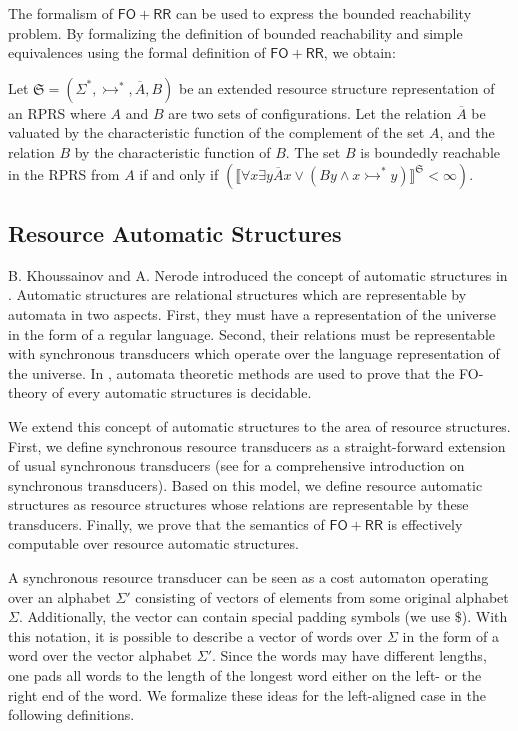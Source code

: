\documentclass{LMCS}
\newcommand{\semantics}[1]{\llbracket#1\rrbracket}
\newcommand{\structureS}{\mathfrak S}
\newcommand{\FORR}{\ensuremath{\mathsf{FO\!\!+\!\!RR}}}
\newcommand{\tspathTo}{\rightarrowtail^*}
\newcommand{\RPRS}{\textsf{RPRS}}
\begin{document}
The formalism of \FORR{} can be used to express the bounded reachability
problem. By formalizing the definition of bounded reachability and 
simple equivalences using the formal definition of \FORR{}, we obtain:

\begin{prop}\label{prop:BoundedReachabilityIsFORRExpressible}
  Let $\structureS = (\Sigma^*,\tspathTo,\overline{A},B)$ be an extended
resource structure representation of an \RPRS{} where $A$ and $B$ are two 
sets of configurations. Let the relation $\overline{A}$ be valuated by the 
characteristic function of the complement of the set $A$, and the relation $B$ by the 
characteristic function of $B$.
The set $B$ is boundedly reachable in the \RPRS{} from $A$ if and only if
  $(\semantics{\forall x \exists y \overline{A}x \vee (By \wedge x \tspathTo
y)}^\structureS < \infty)$.
\end{prop}


\subsection{Resource Automatic Structures}
\label{subsec:ResourceAutomaticStructures}

B. Khoussainov and A. Nerode introduced the concept of automatic structures in
\cite{automatic-structures}. Automatic structures are relational structures
which are representable by automata in two aspects. First, they must have a
representation of the universe in the form of a regular language. Second, their
relations must be representable with synchronous transducers which operate over
the language representation of the universe. In \cite{automatic-structures},
automata theoretic methods are used to prove that the FO-theory of every 
automatic structures is decidable. 

We extend this concept of automatic structures to the area of resource
structures. First, we define synchronous resource transducers as a
straight-forward extension of usual synchronous transducers (see
\cite{khoussainov-automata-theory-and-app} for a comprehensive introduction on
synchronous transducers). Based on this model, we define
resource automatic structures as resource structures whose relations are
representable by these transducers. Finally, we prove that the semantics of
\FORR{} is effectively computable over resource automatic structures. 


A synchronous resource transducer can be seen as a cost automaton operating
over an alphabet $\Sigma'$ consisting of vectors of elements from some original
alphabet $\Sigma$. Additionally, the vector can contain special padding symbols
(we use $\$$). With this notation, it is possible to describe a vector of words
over $\Sigma$ in the form of a word over the vector alphabet $\Sigma'$. Since the
words may have different lengths, one pads all words to the length of the
longest word either on the left- or the right end of the word.  We formalize
these ideas for the left-aligned case in the following definitions.
\end{document}
